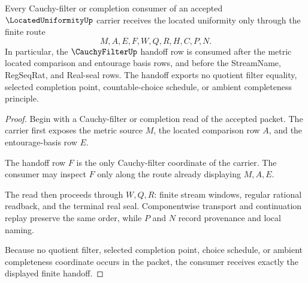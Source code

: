 \begin{theorem}
\label{thm:located-uniformity-cauchy-filter-handoff}
Every Cauchy-filter or completion consumer of an accepted
$\LocatedUniformityUp$ carrier receives the located uniformity only through the
finite route
$$
M,A,E,F,W,Q,R,H,C,P,N .
$$
In particular, the $\CauchyFilterUp$ handoff row is consumed after the metric
located comparison and entourage basis rows, and before the StreamName,
RegSeqRat, and Real-seal rows. The handoff exports no quotient filter equality,
selected completion point, countable-choice schedule, or ambient completeness
principle.
\end{theorem}
\begin{proof}
Begin with a Cauchy-filter or completion read of the accepted packet. The
carrier first exposes the metric source $M$, the located comparison row $A$,
and the entourage-basis row $E$.

The handoff row $F$ is the only Cauchy-filter coordinate of the carrier. The
consumer may inspect $F$ only along the route already displaying $M,A,E$.

The read then proceeds through $W,Q,R$: finite stream windows, regular rational
readback, and the terminal real seal. Componentwise transport and continuation
replay preserve the same order, while $P$ and $N$ record provenance and local
naming.

Because no quotient filter, selected completion point, choice schedule, or
ambient completeness coordinate occurs in the packet, the consumer receives
exactly the displayed finite handoff.
\end{proof}

